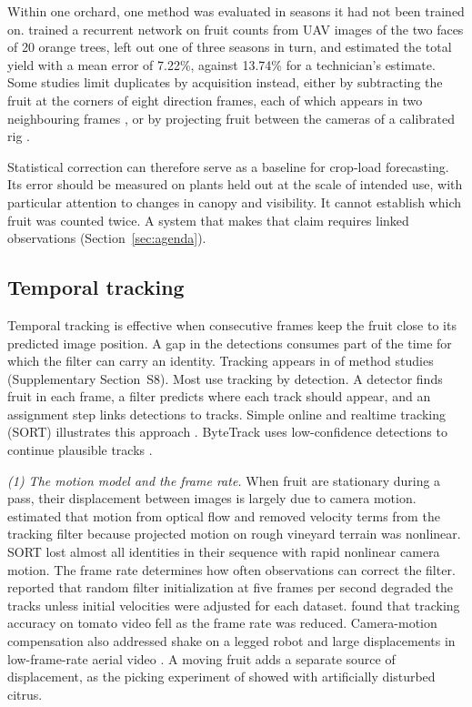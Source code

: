 Within one orchard, one method was evaluated in seasons it had not been trained on. \citet{apoloapolo2020deep} trained a recurrent network on fruit counts from UAV images of the two faces of 20 orange trees, left out one of three seasons in turn, and estimated the total yield with a mean error of 7.22\%, against 13.74\% for a technician's estimate. Some studies limit duplicates by acquisition instead, either by subtracting the fruit at the corners of eight direction frames, each of which appears in two neighbouring frames \citep{nenavath2024tree}, or by projecting fruit between the cameras of a calibrated rig \citep{villacres2024assessing}.

Statistical correction can therefore serve as a baseline for crop-load forecasting. Its error should be measured on plants held out at the scale of intended use, with particular attention to changes in canopy and visibility. It cannot establish which fruit was counted twice. A system that makes that claim requires linked observations (Section~\ref{sec:agenda}).

\subsection{Temporal tracking}\label{sec:mech-track}
Temporal tracking is effective when consecutive frames keep the fruit close to its predicted image position. A gap in the detections consumes part of the time for which the filter can carry an identity. Tracking appears in \nTrack of \nMethod method studies (Supplementary Section~S8). Most use tracking by detection. A detector finds fruit in each frame, a filter predicts where each track should appear, and an assignment step links detections to tracks. Simple online and realtime tracking (SORT) illustrates this approach \citep{bewley2016simple}. ByteTrack uses low-confidence detections to continue plausible tracks \citep{zhang2022bytetrack}.

\textit{(1) The motion model and the frame rate.} When fruit are stationary during a pass, their displacement between images is largely due to camera motion. \citet{saraceni2024agrisort} estimated that motion from optical flow and removed velocity terms from the tracking filter because projected motion on rough vineyard terrain was nonlinear. SORT lost almost all identities in their sequence with rapid nonlinear camera motion. The frame rate determines how often observations can correct the filter. \citet{wei2025multi} reported that random filter initialization at five frames per second degraded the tracks unless initial velocities were adjusted for each dataset. \citet{qi2025assessment} found that tracking accuracy on tomato video fell as the frame rate was reduced. Camera-motion compensation also addressed shake on a legged robot \citep{zhang2024stablesort} and large displacements in low-frame-rate aerial video \citep{xieli2025pinesort}. A moving fruit adds a separate source of displacement, as the picking experiment of \citet{lou2024online} showed with artificially disturbed citrus.

